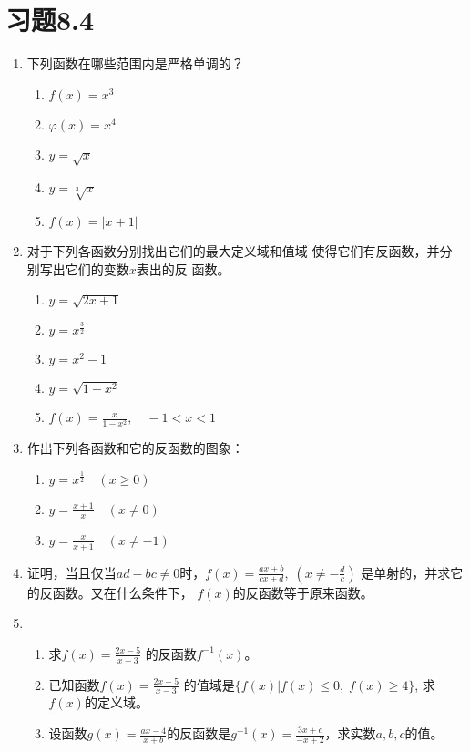 \section*{习题8.4}
\begin{enumerate}
\item 下列函数在哪些范围内是严格单调的？
\begin{multicols}{2}
  \begin{enumerate}
    \item $f(x)=x^3$
    \item $\varphi(x)=x^4$
    \item $y=\sqrt{x}$
    \item $y=\sqrt[3]{x}$
    \item $f(x)=|x+1|$
\end{enumerate}  
\end{multicols}


\item 对于下列各函数分别找出它们的最大定义域和值域
使得它们有反函数，并分别写出它们的变数$x$表出的反
函数。
\begin{multicols}{2}
    \begin{enumerate}
      \item $y=\sqrt{2x+1}$
      \item $y=x^{\tfrac{3}{2}}$
      \item $y=x^2-1$
      \item $y=\sqrt{1-x^2}$
      \item $f(x)=\frac{x}{1-x^2},\quad -1<x<1$
  \end{enumerate}  
  \end{multicols}

\item 作出下列各函数和它的反函数的图象：
\begin{multicols}{2}
    \begin{enumerate}
      \item $y=x^{\tfrac{1}{2}}\quad (x\ge 0)$
      \item $y=\frac{x+1}{x}\quad (x\ne 0)$
      \item $y=\frac{x}{x+1}\quad (x\ne -1)$
  \end{enumerate}  
  \end{multicols}

\item 证明，当且仅当$ad-bc\ne 0$时，$f(x)=\frac{ax+b}{cx+d},\; \left(x\ne -\frac{d}{c}\right)$
是单射的，并求它的反函数。又在什么条件下，
$f(x)$的反函数等于原来函数。
\item \begin{enumerate}
\item 求$f(x)=\frac{2x-5}{x-3}$
的反函数$f^{-1}(x)$。
\item 已知函数$f(x)=\frac{2x-5}{x-3}$
的值域是$\{f(x)|f(x)\le 0,\; f(x)\ge 4\}$, 求$f(x)$的定义域。
\item 设函数$g(x)=\frac{ax-4}{x+b}$的反函数是$g^{-1}(x)=\frac{3x+c}{-x+2}$，求实数$a,b,c$的值。
\end{enumerate}


\end{enumerate}
